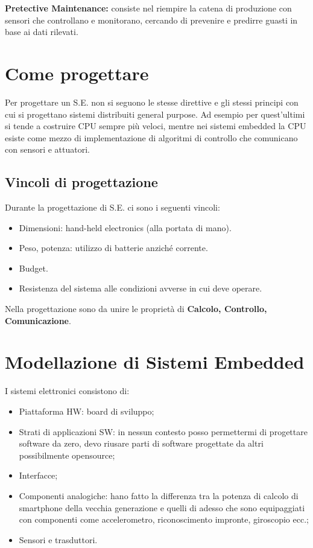\documentclass[a4paper]{article}
\begin{document}
		\noindent
		\textbf{Pretective Maintenance:} consiste nel riempire la catena di produzione con sensori che controllano e monitorano, cercando di prevenire e predirre guasti in base ai dati rilevati.
		
	\section{Come progettare}
		Per progettare un S.E. non si seguono le stesse direttive e gli stessi principi con cui si progettano sistemi distribuiti general purpose. Ad esempio per quest'ultimi si tende a costruire CPU sempre più veloci, mentre nei sistemi embedded la CPU esiste come mezzo di implementazione di algoritmi di controllo che comunicano con sensori e attuatori. 
		
	\subsection{Vincoli di progettazione}
		Durante la progettazione di S.E. ci sono i seguenti vincoli:
		\begin{itemize}
			\item Dimensioni: hand-held electronics (alla portata di mano).
			\item Peso, potenza: utilizzo di batterie anziché corrente. 
			\item Budget.
			\item Resistenza del sistema alle condizioni avverse in cui deve operare.
		\end{itemize}
		Nella progettazione sono da unire le proprietà di \textbf{Calcolo, Controllo, Comunicazione}.
		
	\section{Modellazione di Sistemi Embedded}
		I sistemi elettronici consistono di:
		\begin{itemize}
			\item Piattaforma HW: board di sviluppo;
			\item Strati di applicazioni SW: in nessun contesto posso permettermi di progettare software da zero, devo riusare parti di software progettate da altri possibilmente opensource;
			\item Interfacce;
			\item Componenti analogiche: hano fatto la differenza tra la potenza di calcolo di smartphone della vecchia generazione e quelli di adesso che sono equipaggiati con componenti come accelerometro, riconoscimento impronte, giroscopio ecc.;
			\item Sensori e trasduttori.
		\end{itemize}
		
\end{document}
